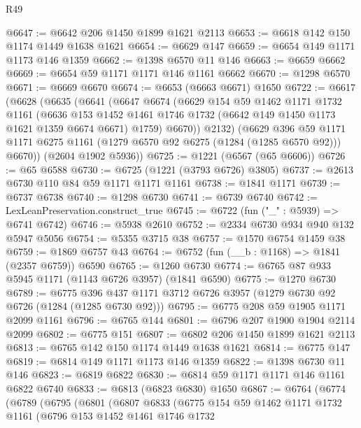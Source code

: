 \begin{lexlean}{R49}
\begin{coremodule}
@6647 := @6642 @206 @1450 @1899 @1621 @2113
@6653 := @6618 @142 @150 @1174 @1449 @1638 @1621
@6654 := @6629 @147
@6659 := @6654 @149 @1171 @1173 @146 @1359
@6662 := @1398 @6570 @11 @146
@6663 := @6659 @6662
@6669 := @6654 @59 @1171 @1171 @146 @1161 @6662
@6670 := @1298 @6570
@6671 := @6669 @6670
@6674 := @6653 (@6663 @6671) @1650
@6722 := @6617
    (@6628
      (@6635
        (@6641
          (@6647
            @6674
            (@6629
              @154
              @59
              @1462
              @1171
              @1732
              @1161
              (@6636
                @153
                @1452
                @1461
                @1746
                @1732
                (@6642 @149 @1450 @1173 @1621 @1359 @6674 @6671)
                @1759)
              @6670))
          @2132)
        (@6629
          @396
          @59
          @1171
          @1171
          @6275
          @1161
          (@1279 @6570 @92 @6275 (@1284 (@1285 @6570 @92)))
          @6670))
      (@2604 @1902 @5936))
@6725 := @1221 (@6567 (@65 @6606))
@6726 := @65 @6588
@6730 := @6725 (@1221 (@3793 @6726) @3805)
@6737 := @2613 @6730 @110 @84 @59 @1171 @1171 @1161
@6738 := @1841 @1171
@6739 := @6737 @6738
@6740 := @1298 @6730
@6741 := @6739 @6740
@6742 := LexLeanPreservation.construct_true
@6745 := @6722 (fun ("_" : @5939) => @6741 @6742)
@6746 := @5938 @2610
@6752 := @2334 @6730 @934 @940 @132 @5947 @5056
@6754 := @5355 @3715 @38
@6757 := @1570 @6754 @1459 @38
@6759 := @1869 @6757 @43
@6764 := @6752 (fun (__b : @1168) => @1841 (@2357 @6759)) @6590
@6765 := @1260 @6730
@6774 := @6765 @87 @933 @5945 @1171 (@1143 @6726 @3957) (@1841 @6590)
@6775 := @1270 @6730
@6789 := @6775 @396 @437 @1171 @3712 @6726 @3957 (@1279 @6730 @92 @6726 (@1284 (@1285 @6730 @92)))
@6795 := @6775 @208 @59 @1905 @1171 @2099 @1161
@6796 := @6765 @144
@6801 := @6796 @207 @1900 @1904 @2114 @2099
@6802 := @6775 @151
@6807 := @6802 @206 @1450 @1899 @1621 @2113
@6813 := @6765 @142 @150 @1174 @1449 @1638 @1621
@6814 := @6775 @147
@6819 := @6814 @149 @1171 @1173 @146 @1359
@6822 := @1398 @6730 @11 @146
@6823 := @6819 @6822
@6830 := @6814 @59 @1171 @1171 @146 @1161 @6822 @6740
@6833 := @6813 (@6823 @6830) @1650
@6867 := @6764
    (@6774
      (@6789
        (@6795
          (@6801
            (@6807
              @6833
              (@6775
                @154
                @59
                @1462
                @1171
                @1732
                @1161
                (@6796
                  @153
                  @1452
                  @1461
                  @1746
                  @1732

\end{coremodule}
\end{lexlean}
